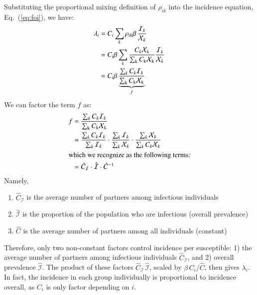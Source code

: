 Substituting the proportional mixing definition of $\rho_{ik}$ into
the incidence equation, Eq.~(\ref{eq:foi}), we have:
\begin{align}
\lambda_i
  &= C_i \sum_k \rho_{ik} \beta \thinspace \frac{\mathcal{I}_k}{\mathcal{X}_k}\\
  &= C_i \beta \sum_k
    \frac{C_k \mathcal{X}_k}{\sum_{\mathrm{k}}C_{\mathrm{k}}\mathcal{X}_{\mathrm{k}}}
    \frac{\mathcal{I}_k}{\mathcal{X}_k}\\
  &= C_i \beta \underbrace{
      \frac{\sum_k C_k \mathcal{I}_k}{\sum_{\mathrm{k}}C_{\mathrm{k}}\mathcal{X}_{\mathrm{k}}}
    }_{f}
\end{align}
We can factor the term $f$ as:
\begin{align}
  f
  &= \frac{\sum_k C_k \mathcal{I}_k}{\sum_{\mathrm{k}}C_{\mathrm{k}}\mathcal{X}_{\mathrm{k}}}\\
  &= \frac{\sum_k C_k \mathcal{I}_k}{\sum_k \mathcal{I}_k}
       \cdot
     \frac{\sum_k \mathcal{I}_k}{\sum_k \mathcal{X}_k}
       \cdot
     \frac{\sum_k \mathcal{X}_k}{\sum_k C_k \mathcal{X}_k}\\
\intertext{which we recognize as the following terms:}
  &= \hat{C}_{\mathcal{I}} \cdot \hat{\mathcal{I}} \cdot \hat{C}^{-1}
\end{align}
Namely,
\begin{enumerate}
  \item $\hat{C}_{\mathcal{I}}$ is the average number of partners among infectious individuals
  \item $\hat{\mathcal{I}}$ is the proportion of the population who are infectious (overall prevalence)
  \item $\hat{C}$ is the average number of partners among all individuals (constant)
\end{enumerate}
Therefore, only two non-constant factors control incidence per susceptible:
1) the average number of partners among infectious individuals $\hat{C}_{\mathcal{I}}$, and
2) overall prevalence $\hat{\mathcal{I}}$.
The product of these factors $\hat{C}_{\mathcal{I}}\,\hat{\mathcal{I}}$,
scaled by $\beta \, C_i / \hat{C}$,
then gives $\lambda_i$.
In fact, the incidence in each group individually is proportional to
incidence overall, as $C_i$ is only factor depending on $i$.




